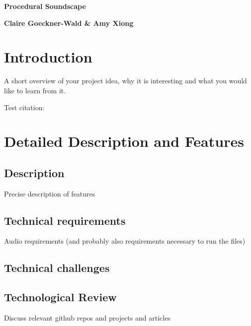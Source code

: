 \documentclass[12pt,a4paper]{article}
\begin{document}
\pagestyle{plain}
 

\begin{center}
{\LARGE{\bf
{{Procedural Soundscape}}
}}
\end{center}
\bigskip

\centerline{\bf 
{Claire Goeckner-Wald \& Amy Xiong}}

\bigskip



\section{Introduction}

A short overview of your project idea, why it is interesting and what you would like to learn from it.

Test citation: \cite{tonejs-instruments}


\section{Detailed Description and Features}

\subsection{Description}
Precise description of features
\subsection{Technical requirements}
Audio requirements (and probably also requirements necessary to run the files)
\subsection{Technical challenges}
\subsection{Technological Review}
Discuss relevant github repos and projects and articles
\end{document}
